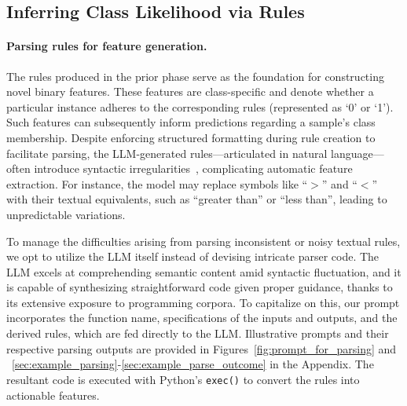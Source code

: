 \subsection{Inferring Class Likelihood via Rules}
\label{Sec:training}

\paragraph{Parsing rules for feature generation.} The rules produced in the prior phase serve as the foundation for constructing novel binary features. These features are class-specific and denote whether a particular instance adheres to the corresponding rules (represented as ‘0’ or ‘1’). Such features can subsequently inform predictions regarding a sample’s class membership. Despite enforcing structured formatting during rule creation to facilitate parsing, the LLM-generated rules—articulated in natural language—often introduce syntactic irregularities~\cite{kovavc2023large}, complicating automatic feature extraction. For instance, the model may replace symbols like ``$>$” and ``$<$” with their textual equivalents, such as ``greater than” or ``less than”, leading to unpredictable variations.

To manage the difficulties arising from parsing inconsistent or noisy textual rules, we opt to utilize the LLM itself instead of devising intricate parser code. The LLM excels at comprehending semantic content amid syntactic fluctuation, and it is capable of synthesizing straightforward code given proper guidance, thanks to its extensive exposure to programming corpora. To capitalize on this, our prompt incorporates the function name, specifications of the inputs and outputs, and the derived rules, which are fed directly to the LLM. Illustrative prompts and their respective parsing outputs are provided in Figures~\ref{fig:prompt_for_parsing} and ~\ref{sec:example_parsing}-\ref{sec:example_parse_outcome} in the Appendix. The resultant code is executed with Python’s \texttt{exec()} to convert the rules into actionable features.

\vspace*{-0.12in}

